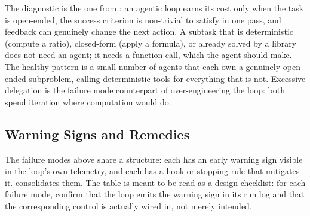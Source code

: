 The diagnostic is the one from : an agentic loop
earns its cost only when the task is open-ended, the success criterion is
non-trivial to satisfy in one pass, and feedback can genuinely change the next
action. A subtask that is deterministic (compute a ratio), closed-form (apply a
formula), or already solved by a library does not need an agent; it needs a
function call, which the agent should make. The healthy pattern is a small number
of agents that each own a genuinely open-ended subproblem, calling deterministic
tools for everything that is not. Excessive delegation is the failure mode
counterpart of over-engineering the loop: both spend iteration where computation
would do.

\subsection{Warning Signs and Remedies}\label{subsec:warning-signs-remedies}

The failure modes above share a structure: each has an early warning sign visible
in the loop's own telemetry, and each has a hook or stopping rule that mitigates
it.  consolidates them. The table is meant to be read
as a design checklist: for each failure mode, confirm that the loop emits the
warning sign in its run log and that the corresponding control is actually wired
in, not merely intended.

